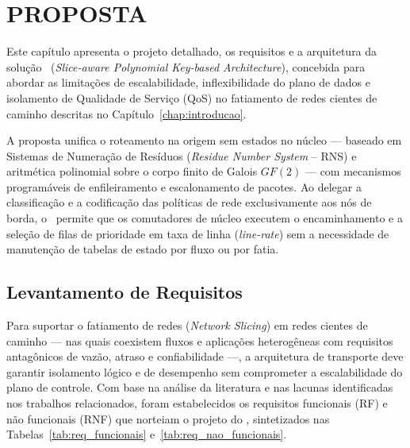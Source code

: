 \chapter{PROPOSTA}
\label{chap:proposta}

Este capítulo apresenta o projeto detalhado, os requisitos e a arquitetura da solução \nome\ (\textit{Slice-aware Polynomial Key-based Architecture}), concebida para abordar as limitações de escalabilidade, inflexibilidade do plano de dados e isolamento de Qualidade de Serviço (QoS) no fatiamento de redes cientes de caminho descritas no Capítulo~\ref{chap:introducao}.

A proposta unifica o roteamento na origem sem estados no núcleo --- baseado em Sistemas de Numeração de Resíduos (\textit{Residue Number System} -- RNS) e aritmética polinomial sobre o corpo finito de Galois $GF(2)$ --- com mecanismos programáveis de enfileiramento e escalonamento de pacotes. Ao delegar a classificação e a codificação das políticas de rede exclusivamente aos nós de borda, o \nome\ permite que os comutadores de núcleo executem o encaminhamento e a seleção de filas de prioridade em taxa de linha (\textit{line-rate}) sem a necessidade de manutenção de tabelas de estado por fluxo ou por fatia.

\section{Levantamento de Requisitos}
\label{sec:requisitos}

Para suportar o fatiamento de redes (\textit{Network Slicing}) em redes cientes de caminho --- nas quais coexistem fluxos e aplicações heterogêneas com requisitos antagônicos de vazão, atraso e confiabilidade ---, a arquitetura de transporte deve garantir isolamento lógico e de desempenho sem comprometer a escalabilidade do plano de controle. Com base na análise da literatura e nas lacunas identificadas nos trabalhos relacionados, foram estabelecidos os requisitos funcionais (RF) e não funcionais (RNF) que norteiam o projeto do \nome, sintetizados nas Tabelas~\ref{tab:req_funcionais} e~\ref{tab:req_nao_funcionais}.

